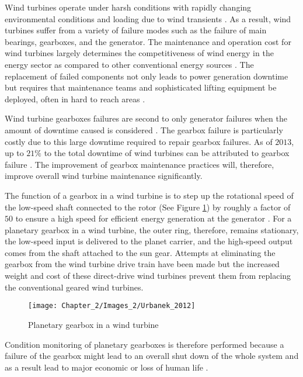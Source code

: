 Wind turbines operate under harsh conditions with rapidly changing environmental conditions and loading due to wind transients \citep{Nie2013,Salameh2018} . As a result, wind turbines suffer from a variety of failure modes such as the failure of main bearings, gearboxes, and the generator. The maintenance and operation cost for wind turbines largely determines the competitiveness of wind energy in the energy sector as compared to other conventional energy sources \citep{Nie2013}. The replacement of failed components not only leads to power generation downtime but requires that maintenance teams and sophisticated lifting equipment be deployed, often in hard to reach areas \citep{Nie2013}.

Wind turbine gearboxes failures are second to only generator failures when the amount of downtime caused is considered \citep{Salameh2018}. The gearbox failure is particularly costly due to this large downtime required to repair gearbox failures. As of $2013$, up to $21\%$ to the total downtime of wind turbines can be attributed to gearbox failure \citep{Nie2013}. The improvement of gearbox maintenance practices will, therefore, improve overall wind turbine maintenance significantly. 

The function of a gearbox in a wind turbine is to step up the rotational speed of the low-speed shaft connected to the rotor (See Figure \ref{F:Urbanek}) by roughly a factor of $50$ to ensure a high speed for efficient energy generation at the generator \citep{Salameh2018}. For a planetary gearbox in a wind turbine, the outer ring, therefore, remains stationary, the low-speed input is delivered to the planet carrier, and the high-speed output comes from the shaft attached to the sun gear. Attempts at eliminating the gearbox from the wind turbine drive train have been made \citep{Morris2011} but the increased weight and cost of these direct-drive wind turbines prevent them from replacing the conventional geared wind turbines.


\begin{figure}[H]
	\centering
	\texttt{[image: Chapter\_2/Images\_2/Urbanek\_2012]}
	\caption{Planetary gearbox in a wind turbine \citep{Urbanek2012}}
	\label{F:Urbanek}
\end{figure}



Condition monitoring of planetary gearboxes is therefore performed because a failure of the gearbox might lead to an overall shut down of the whole system and as a result lead to major economic or loss of human life \cite{Lei2014}.





